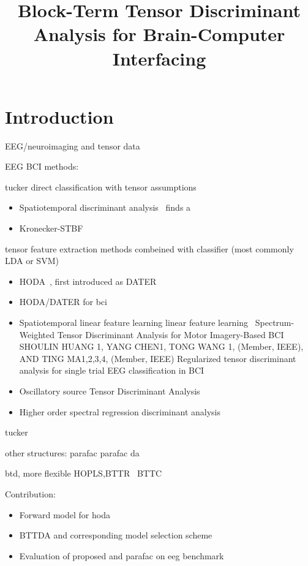 \documentclass[twocolumn]{article}
\title{Block-Term Tensor Discriminant Analysis for Brain-Computer Interfacing}
\begin{document}
\maketitle

\section{Introduction}

EEG/neuroimaging and tensor data



EEG BCI methods:

tucker
direct classification with tensor assumptions
\begin{itemize}
  \item Spatiotemporal discriminant analysis~\cite{Li2010,Zhang2013} finds a
  \item Kronecker-STBF~\cite{Kerchove2022}
\end{itemize}


tensor feature extraction methods
combeined with classifier (most commonly LDA or SVM)
\begin{itemize}

  \item HODA~\cite{Phan2010}, first introduced as DATER~\cite{Yan2005}
  \item HODA/DATER for bci~\cite{Onishi2012,Liu2015,Higashi2016,Cai2021}
  \item Spatiotemporal linear feature learning linear feature
    learning~\cite{Aghili2023}
Spectrum-Weighted Tensor Discriminant Analysis
for Motor Imagery-Based BCI
SHOULIN HUANG 1, YANG CHEN1, TONG WANG 1, (Member, IEEE),
AND TING MA1,2,3,4, (Member, IEEE)
Regularized tensor discriminant analysis for single trial EEG classification in BCI
  \item Oscillatory source Tensor Discriminant Analysis~\cite{Jorajuria2022}
  \item Higher order spectral regression discriminant
    analysis~\cite{Jamshidi2017}
\end{itemize}

tucker

other structures:
 parafac
 parafac da~\cite{Froelich2018}

 btd, more flexible
 HOPLS,BTTR~\cite{Faes2022,Faes2022b} BTTC~\cite{Camarrone2021}



Contribution:
\begin{itemize}
  \item Forward model for hoda
  \item BTTDA and corresponding model selection scheme
  \item Evaluation of proposed and parafac on eeg benchmark
\end{itemize}
\end{document}
